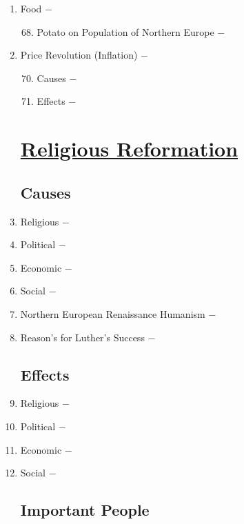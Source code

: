 \documentclass[12pt]{article}
\begin{document}
\begin{enumerate}
\item Food $-$ 

\begin{enumerate}[label=\arabic{*}.]
\setcounter{enumii}{67}
\item Potato on Population of Northern Europe $-$ 
\end{enumerate}
\setcounter{enumi}{68}
\item Price Revolution (Inflation) $-$

\begin{enumerate}[label=\arabic{*}.]
\setcounter{enumii}{69}
\item Causes $-$

\item Effects $-$
\end{enumerate}
\setcounter{enumi}{71}
\section{\underline{Religious Reformation}}

\subsection{Causes}

\item Religious $-$

\item Political $-$

\item Economic $-$

\item Social $-$

\item Northern European Renaissance Humanism $-$ 

\item Reason's for Luther's Success $-$ 

\subsection{Effects}

\item Religious $-$ 

\item Political $-$ 

\item Economic $-$ 

\item Social $-$ 

\subsection{Important People}


\end{enumerate}
\end{document}
